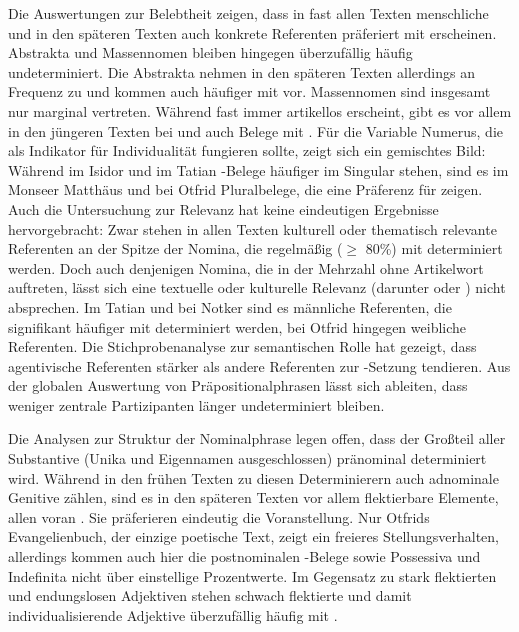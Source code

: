 Die Auswertungen zur Belebtheit zeigen, dass in fast allen Texten menschliche und in den späteren Texten auch konkrete Referenten präferiert mit  erscheinen. Abstrakta und Massennomen bleiben hingegen überzufällig häufig undeterminiert. Die Abstrakta nehmen in den späteren Texten allerdings an Frequenz zu und kommen auch häufiger mit  vor. Massennomen sind insgesamt nur marginal vertreten. Während   fast immer artikellos erscheint, gibt es vor allem in den jüngeren Texten bei  und  auch Belege mit . Für die Variable Numerus, die als Indikator für Individualität fungieren sollte, zeigt sich ein gemischtes Bild:  Während im Isidor und im Tatian -Belege häufiger im Singular stehen, sind es im Monseer Matthäus und bei Otfrid Pluralbelege, die eine Präferenz für  zeigen. Auch die Untersuchung zur Relevanz hat keine eindeutigen Ergebnisse hervorgebracht: Zwar stehen in allen Texten kulturell oder thematisch relevante Referenten an der Spitze der Nomina, die regelmäßig ($\geq$ 80\%) mit  determiniert werden. Doch auch denjenigen Nomina, die in der Mehrzahl ohne Artikelwort auftreten, lässt sich eine textuelle oder kulturelle Relevanz (darunter  oder ) nicht absprechen. Im Tatian und bei Notker sind es männliche Referenten, die signifikant häufiger mit  determiniert werden, bei Otfrid hingegen weibliche Referenten. Die Stichprobenanalyse zur semantischen Rolle hat gezeigt, dass agentivische Referenten stärker als andere Referenten zur -Setzung tendieren. Aus der globalen Auswertung von Präpositionalphrasen lässt sich ableiten, dass weniger zentrale Partizipanten länger undeterminiert bleiben. 

Die Analysen zur Struktur der Nominalphrase legen offen, dass der Großteil aller Substantive (Unika und Eigennamen ausgeschlossen) pränominal determiniert wird. Während in den frühen Texten zu diesen Determinierern auch adnominale Genitive zählen, sind es in den späteren Texten vor allem flektierbare Elemente, allen voran . Sie präferieren eindeutig die Voranstellung. Nur Otfrids Evangelienbuch, der einzige poetische Text, zeigt ein freieres Stellungsverhalten, allerdings kommen auch hier die postnominalen -Belege sowie Possessiva und Indefinita nicht über einstellige Prozentwerte. Im Gegensatz zu stark flektierten und endungslosen Adjektiven stehen schwach flektierte und damit individualisierende Adjektive überzufällig häufig mit .
